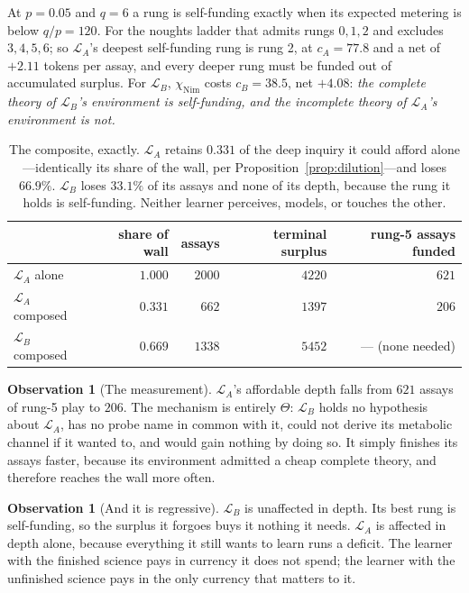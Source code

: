 \documentclass[11pt,a4paper]{article}
\theoremstyle{plain}
\theoremstyle{definition}
\newtheorem{observation}[theorem]{Observation}
\theoremstyle{remark}
\newcommand{\Lrn}{\mathcal{L}}
\begin{document}
At $p = 0.05$ and $q = 6$ a rung is self-funding exactly when its expected metering is below
$q/p = 120$. For the noughts ladder that admits rungs $0,1,2$ and excludes $3,4,5,6$; so
$\Lrn_A$'s deepest self-funding rung is rung 2, at $c_A = 77.8$ and a net of $+2.11$ tokens per
assay, and every deeper rung must be funded out of accumulated surplus. For $\Lrn_B$, $\chi_{\mathrm{Nim}}$
costs $c_B = 38.5$, net $+4.08$: \emph{the complete theory of $\Lrn_B$'s environment is
self-funding, and the incomplete theory of $\Lrn_A$'s environment is not.}

\begin{table}[t]
\centering
\small
\begin{tabular}{@{}lrrrr@{}}
\toprule
 & share of wall & assays & terminal surplus & rung-5 assays funded \\
\midrule
$\Lrn_A$ alone & $1.000$ & $2000$ & $4220$ & $621$ \\
$\Lrn_A$ composed & $0.331$ & $662$ & $1397$ & $206$ \\
$\Lrn_B$ composed & $0.669$ & $1338$ & $5452$ & --- (none needed) \\
\bottomrule
\end{tabular}
\caption{The composite, exactly. $\Lrn_A$ retains $0.331$ of the deep inquiry it could afford
alone---identically its share of the wall, per Proposition~\ref{prop:dilution}---and loses
$66.9\%$. $\Lrn_B$ loses $33.1\%$ of its assays and none of its depth, because the rung it holds
is self-funding. Neither learner perceives, models, or touches the other.}
\label{tab:composite}
\end{table}

\begin{observation}[The measurement]
$\Lrn_A$'s affordable depth falls from $621$ assays of rung-5 play to $206$. The mechanism is
entirely $\Theta$: $\Lrn_B$ holds no hypothesis about $\Lrn_A$, has no probe name in common with
it, could not derive its metabolic channel if it wanted to, and would gain nothing by doing so.
It simply finishes its assays faster, because its environment admitted a cheap complete theory,
and therefore reaches the wall more often.
\end{observation}

\begin{observation}[And it is regressive]
$\Lrn_B$ is unaffected in depth. Its best rung is self-funding, so the surplus it forgoes buys it
nothing it needs. $\Lrn_A$ is affected in depth alone, because everything it still wants to learn
runs a deficit. The learner with the finished science pays in currency it does not spend; the
learner with the unfinished science pays in the only currency that matters to it.
\end{observation}
\end{document}
